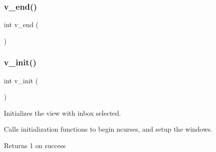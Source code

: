 \subsubsection{v\+\_\+end()}
{\footnotesize\ttfamily int v\+\_\+end (\begin{DoxyParamCaption}{ }\end{DoxyParamCaption})}

\mbox{\label{view_8h_ad54046745cc107dfd25366212d92fa2c}} 
\subsubsection{v\+\_\+init()}
{\footnotesize\ttfamily int v\+\_\+init (\begin{DoxyParamCaption}{ }\end{DoxyParamCaption})}



Initializes the view with inbox selected. 

Calls initialization functions to begin ncurses, and setup the windows.

\begin{DoxyReturn}{Returns}
1 on success 
\end{DoxyReturn}
